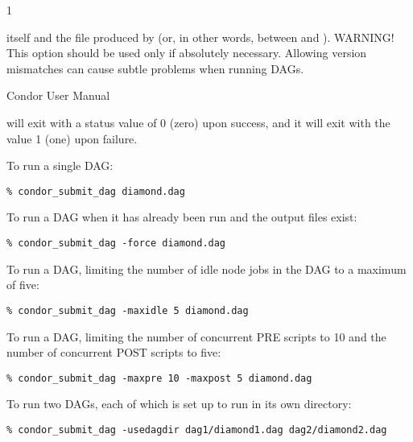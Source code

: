 \begin{ManPage}{\label{man-condor-submit-dag}}{1}
\begin{Options}
{      itself and the  file produced
     by  (or, in other words, between
      and ).  WARNING!  This option
     should be used only if absolutely necessary.  Allowing version
     mismatches can cause subtle problems when running DAGs.
  }
  \end{Options}

\SeeAlso
Condor User Manual

\ExitStatus

 will exit with a status value of 0 (zero) upon success,
and it will exit with the value 1 (one) upon failure.

\Examples

To run a single DAG:
\begin{verbatim}
% condor_submit_dag diamond.dag
\end{verbatim}

To run a DAG when it has already been run and the output files exist:
\begin{verbatim}
% condor_submit_dag -force diamond.dag
\end{verbatim}

To run a DAG, limiting the number of idle node jobs in the DAG to a
maximum of five:
\begin{verbatim}
% condor_submit_dag -maxidle 5 diamond.dag
\end{verbatim}

To run a DAG, limiting the number of concurrent PRE scripts to 10
and the number of concurrent POST scripts to five:
\begin{verbatim}
% condor_submit_dag -maxpre 10 -maxpost 5 diamond.dag
\end{verbatim}

To run two DAGs, each of which is set up to run in its own directory:
\begin{verbatim}
% condor_submit_dag -usedagdir dag1/diamond1.dag dag2/diamond2.dag
\end{verbatim}

\end{ManPage}

